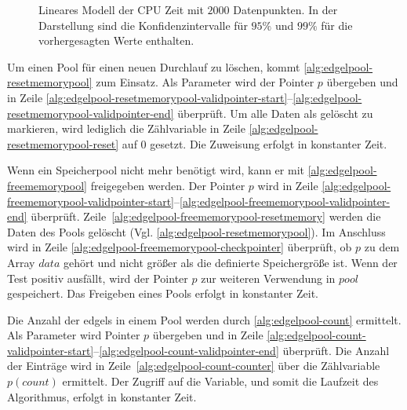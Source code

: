 \begin{figure}[!ht]
	\centering
	
	\caption{Lineares Modell der CPU Zeit mit $2000$ Datenpunkten. In der Darstellung sind die Konfidenzintervalle für
	 $95\%$ und $99\%$ für die vorhergesagten Werte enthalten.}
	\label{fig:regression-memmove}
\end{figure}

Um einen Pool für einen neuen Durchlauf zu löschen, kommt \autoref{alg:edgelpool-resetmemorypool} zum Einsatz. Als
 Parameter wird der Pointer $p$ übergeben und in Zeile
 \ref{alg:edgelpool-resetmemorypool-validpointer-start}--\ref{alg:edgelpool-resetmemorypool-validpointer-end}
 überprüft. Um alle Daten als gelöscht zu markieren, wird lediglich die Zählvariable in Zeile
 \ref{alg:edgelpool-resetmemorypool-reset} auf $0$ gesetzt. Die Zuweisung erfolgt in konstanter Zeit.



Wenn ein Speicherpool nicht mehr benötigt wird, kann er mit \autoref{alg:edgelpool-freememorypool} freigegeben werden.
 Der Pointer $p$ wird in Zeile
 \ref{alg:edgelpool-freememorypool-validpointer-start}--\ref{alg:edgelpool-freememorypool-validpointer-end} überprüft.
 Zeile~\ref{alg:edgelpool-freememorypool-resetmemory} werden die Daten des Pools gelöscht
 (Vgl. \autoref{alg:edgelpool-resetmemorypool}). Im Anschluss wird in Zeile
 \ref{alg:edgelpool-freememorypool-checkpointer} überprüft, ob $p$ zu dem Array $\mathit{data}$ gehört und nicht größer
 als die definierte Speichergröße ist. Wenn der Test positiv ausfällt, wird der Pointer $p$ zur weiteren Verwendung in
 $\mathit{pool}$ gespeichert. Das Freigeben eines Pools erfolgt in konstanter Zeit.



Die Anzahl der \glspl{edgel} in einem Pool werden durch \autoref{alg:edgelpool-count} ermittelt. Als Parameter wird
 Pointer $p$ übergeben und in Zeile
 \ref{alg:edgelpool-count-validpointer-start}--\ref{alg:edgelpool-count-validpointer-end} überprüft. Die Anzahl der
 Einträge wird in Zeile~\ref{alg:edgelpool-count-counter} über die Zählvariable $p(\mathit{count})$ ermittelt. Der
 Zugriff auf die Variable, und somit die Laufzeit des Algorithmus, erfolgt in konstanter Zeit.



